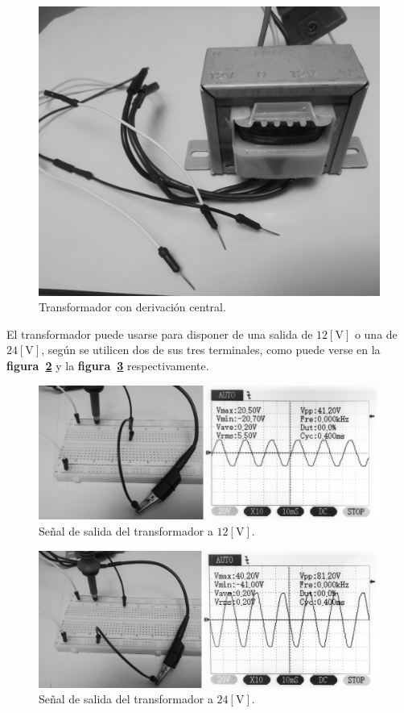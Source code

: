 \begin{figure}[!h]
\centering
\includegraphics[scale=0.34]{fotos/01.transformador1.eps}
\caption{Transformador con derivación central.}
\label{laboratorio01}
\end{figure}

El transformador puede usarse para disponer de una salida de $12[\text{V}]$ o
una de $24[\text{V}]$, según se utilicen dos de sus tres terminales, como puede
verse en la \textbf{figura~\ref{laboratorio02}} y la
\textbf{figura~\ref{laboratorio03}} respectivamente.

\begin{figure}[!h]
\centering
\includegraphics[scale=0.34]{fotos/01.transformador2.eps}
\caption{Señal de salida del transformador a $12[\text{V}]$.}
\label{laboratorio02}
\end{figure}

\begin{figure}[!h]
\centering
\includegraphics[scale=0.34]{fotos/01.transformador3.eps}
\caption{Señal de salida del transformador a $24[\text{V}]$.}
\label{laboratorio03}
\end{figure}

